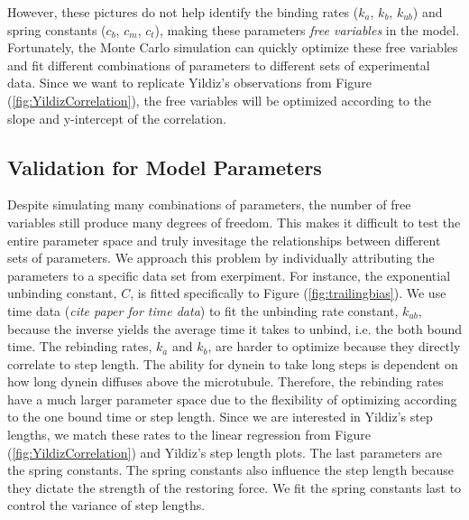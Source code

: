 However, these pictures do not help identify the binding rates ($k_a$, $k_b$, $k_{ub}$) and spring constants ($c_b$, $c_m$, $c_t$), making these parameters \textit{free variables} in the model. Fortunately, the Monte Carlo simulation can quickly optimize these free variables and fit different combinations of parameters to  different sets of experimental data. Since we want to replicate Yildiz's observations from Figure (\ref{fig:YildizCorrelation}), the free variables will be optimized according to the slope and y-intercept of the correlation. 

\subsection{Validation for Model Parameters}

Despite simulating many combinations of parameters, the number of free variables still produce many degrees of freedom. This makes it difficult to test the entire parameter space and truly invesitage the relationships between different sets of parameters. We approach this problem by individually attributing the parameters to a specific data set from exerpiment. For instance, the exponential unbinding constant, $C$, is fitted specifically to Figure (\ref{fig:trailingbias}). We use time data (\textit{cite paper for time data}\cite{}) to fit the unbinding rate constant, $k_{ub}$, because the inverse yields the average time it takes to unbind, i.e. the both bound time. The rebinding rates, $k_a$ and $k_b$, are harder to optimize because they directly correlate to step length. The ability for dynein to take long steps is dependent on how long dynein diffuses above the microtubule. Therefore, the rebinding rates have a much larger parameter space due to the flexibility of optimizing according to the one bound time or step length. Since we are interested in Yildiz's step lengths, we match these rates to the linear regression from Figure (\ref{fig:YildizCorrelation}) and Yildiz's step length plots. The last parameters are the spring constants. The spring constants also influence the step length because they dictate the strength of the restoring force. We fit the spring constants last to control the variance of step lengths.





